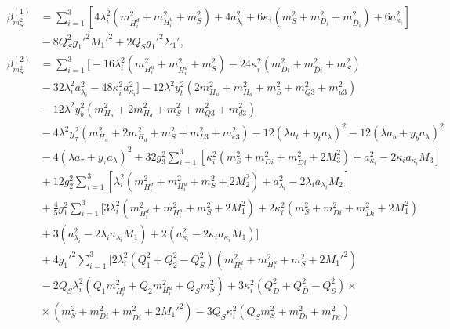 \documentclass[preprint,amsmath,amssymb,aps,superscriptaddress,prd,showpacs,floatfix,nofootinbib]{revtex4-1}
\begin{document}
\begin{subequations}
\begin{align}
\beta_{m_S^2}^{(1)}&=\sum_{i=1}^3\left [ 4\lambda_i^2\left ( m_{H_i^d}^2+m_{H_i^u}^2+m_S^2\right )+4a_{\lambda_i}^2+6\kappa_i\left ( m_S^2+m_{D_i}^2+m_{\overline{D}_i}^2\right )+6a_{\kappa_i}^2\right ]\nonumber\\
&{}-8Q_S^2g_1'^2M_1'^2+2Q_Sg_1'^2\Sigma_1',\label{eq:USSMms2BetaOneLoop}\\
\beta_{m_S^2}^{(2)}&=\sum_{i=1}^3\bigg [ -16\lambda_i^2\left ( m_{H_i^u}^2+m_{H_i^d}^2+m_S^2 \right )-24\kappa_i^2\left ( m_{Di}^2+m_{\overline{D}i}^2+m_S^2 \right )\nonumber\\
&{}-32\lambda_i^2a_{\lambda_i}^2-48\kappa_i^2a_{\kappa_i}^2\bigg ]-12\lambda^2y_t^2\left ( 2m_{H_u}^2+m_{H_d}^2+m_S^2+m_{Q3}^2+m_{u3}^2\right )\nonumber\\
&{}-12\lambda^2y_b^2\left ( m_{H_u}^2+2m_{H_d}^2+m_S^2+m_{Q3}^2+m_{d3}^2\right )\nonumber\\
&{}-4\lambda^2y_\tau^2\left ( m_{H_u}^2+2m_{H_d}^2+m_S^2+m_{L3}^2+m_{e3}^2\right )-12\left ( \lambda a_t+y_ta_\lambda\right )^2-12\left ( \lambda a_b+y_ba_\lambda\right )^2\nonumber\\
&{}-4\left ( \lambda a_\tau+y_\tau a_\lambda\right )^2+32g_3^2\sum_{i=1}^3\left [ \kappa_i^2\left ( m_S^2+m_{Di}^2+m_{\overline{D}i}^2+2M_3^2\right )+a_{\kappa_i}^2-2\kappa_ia_{\kappa_i}M_3 \right ]\nonumber\\
&{}+12g_2^2\sum_{i=1}^3\left [ \lambda_i^2\left ( m_{H_i^d}^2+m_{H_i^u}^2+m_S^2+2M_2^2\right )+a_{\lambda_i}^2-2\lambda_ia_{\lambda_i}M_2\right ]\nonumber\\
&{}+\frac{4}{5}g_1^2\sum_{i=1}^3\bigg [ 3\lambda_i^2\left ( m_{H_i^d}^2+m_{H_i^u}^2+m_S^2+2M_1^2\right )+2\kappa_i^2\left ( m_S^2+m_{Di}^2+m_{\overline{D}i}^2+2M_1^2\right )\nonumber\\
&{}+3\left (a_{\lambda_i}^2-2\lambda_ia_{\lambda_i}M_1\right )+2\left (a_{\kappa_i}^2-2\kappa_ia_{\kappa_i}M_1\right )\bigg ]\nonumber\\
&{}+4g_1'^2\sum_{i=1}^3\bigg [ 2\lambda_i^2\left ( Q_1^2+Q_2^2-Q_S^2\right )\left ( m_{H_i^d}^2+m_{H_i^u}^2+m_S^2+2M_1'^2\right )\nonumber\\
&{}-2Q_S\lambda_i^2\left ( Q_1m_{H_i^d}^2+Q_2m_{H_i^u}^2+Q_Sm_S^2\right )+3\kappa_i^2\left ( Q_D^2+Q_{\overline{D}}^2-Q_S^2\right )\times\nonumber\\
&{}\times\left ( m_S^2+m_{Di}^2+m_{\overline{D}i}^2+2M_1'^2\right )-3Q_S\kappa_i^2\left ( Q_Sm_S^2+m_{Di}^2+m_{\overline{D}i}^2\right )\nonumber\\

\end{align}
\end{subequations}
\end{document}
